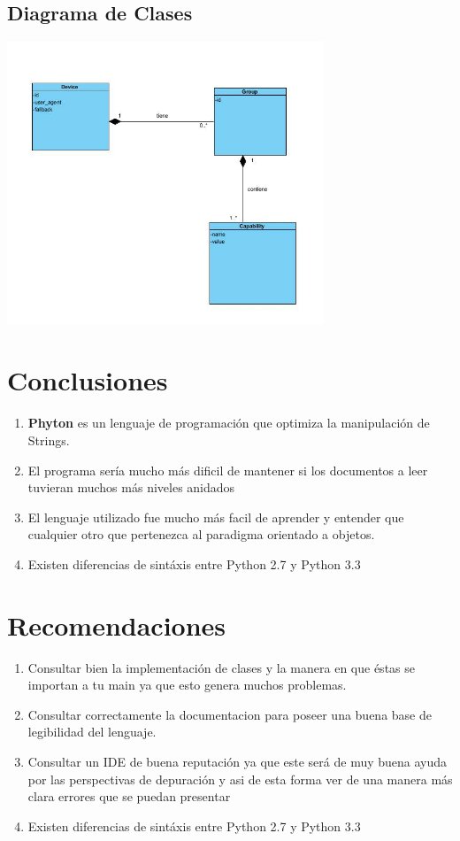 \documentclass[11pt]{article}
\begin{document}
\subsection{\textbf{Diagrama de Clases}}

				\begin{center}
				\includegraphics[width=0.71\textwidth]{images/class_diagram}
				\end{center}

\section{\textbf{Conclusiones}}
\begin{enumerate}
\item
{\textbf{Phyton}} es un lenguaje de programación que optimiza la manipulación de Strings.
\item
El programa sería mucho más dificil de mantener si los documentos a leer tuvieran muchos más niveles anidados
\item
El lenguaje utilizado fue mucho más facil de aprender y entender que cualquier otro que pertenezca al paradigma orientado a objetos.
\item
Existen diferencias de sintáxis entre Python 2.7 y Python 3.3
\end{enumerate}

\section{\textbf{Recomendaciones}}
\begin{enumerate}
\item
Consultar bien la implementación de clases y la manera en que éstas se importan a tu main ya que esto genera muchos problemas.
\item
Consultar correctamente la documentacion para poseer una buena base de legibilidad del lenguaje.
\item
Consultar un IDE de buena reputación ya que este será de muy buena ayuda por las perspectivas de depuración y asi de esta forma ver de una manera más clara errores que se puedan presentar
\item
Existen diferencias de sintáxis entre Python 2.7 y Python 3.3
\end{enumerate}
\end{document}

